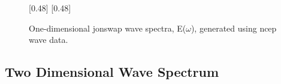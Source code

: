 
\begin{figure} [H]
    \centering
    [0.48\linewidth]{
        \resizebox{\linewidth}{!}{}
    }
    [0.48\linewidth]{
        \resizebox{\linewidth}{!}{}
    }
    \caption{One-dimensional \acs{jonswap} wave spectra, E($\omega$), generated using \acs{ncep} wave data.}
    \label{fig:systemDesign.1DSampleWaveSpectrum}
\end{figure}

\subsection{Two Dimensional Wave Spectrum} \label{subsec:systemDesign.waveSpectrum.2DSpectrum}

